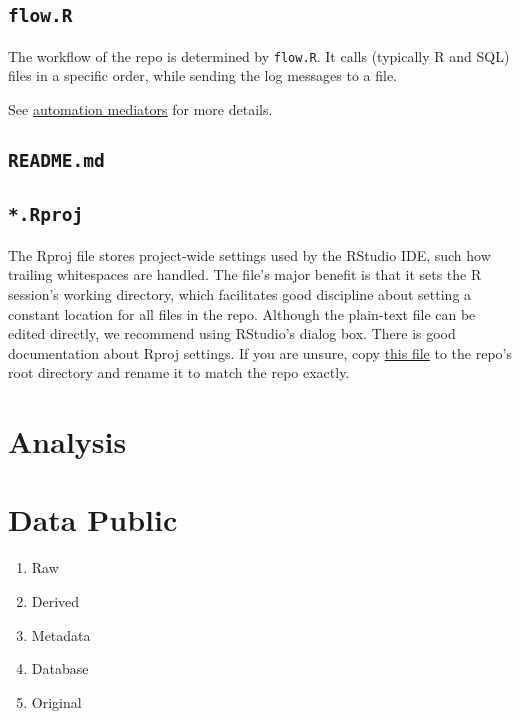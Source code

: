 \documentclass[
]{book}
\providecommand{\tightlist}{%
  \setlength{\itemsep}{0pt}\setlength{\parskip}{0pt}}
\begin{document}
\hypertarget{repo-flow}{%
\subsection{\texorpdfstring{\texttt{flow.R}}{flow.R}}\label{repo-flow}}

The workflow of the repo is determined by \texttt{flow.R}. It calls (typically R and SQL) files in a specific order, while sending the log messages to a file.

See \protect\hyperlink{automation-flow}{automation mediators} for more details.

\hypertarget{repo-readme}{%
\subsection{\texorpdfstring{\texttt{README.md}}{README.md}}\label{repo-readme}}

\hypertarget{repo-rproj}{%
\subsection{\texorpdfstring{\texttt{*.Rproj}}{*.Rproj}}\label{repo-rproj}}

The Rproj file stores project-wide settings used by the RStudio IDE, such how trailing whitespaces are handled. The file's major benefit is that it sets the R session's working directory, which facilitates good discipline about setting a constant location for all files in the repo. Although the plain-text file can be edited directly, we recommend using RStudio's dialog box. There is good documentation about Rproj settings. If you are unsure, copy \href{https://github.com/wibeasley/RAnalysisSkeleton/blob/master/RAnalysisSkeleton.Rproj}{this file} to the repo's root directory and rename it to match the repo exactly.

\hypertarget{repo-analysis}{%
\section{Analysis}\label{repo-analysis}}

\hypertarget{repo-data-public}{%
\section{Data Public}\label{repo-data-public}}

\begin{enumerate}
\def\labelenumi{\arabic{enumi}.}
\tightlist
\item
  Raw
\item
  Derived
\item
  Metadata
\item
  Database
\item
  Original
\end{enumerate}
\end{document}
